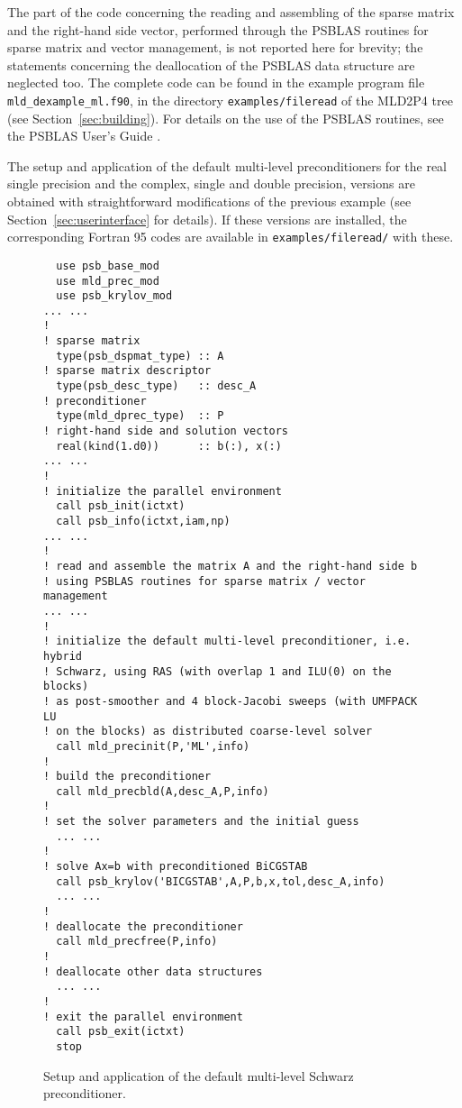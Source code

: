 The part of the code concerning the
reading and assembling of the sparse matrix and the right-hand side vector, performed
through the PSBLAS routines for sparse matrix and vector management, is not reported
here for brevity; the statements concerning the deallocation of the PSBLAS
data structure are neglected too.
The complete code can be found in the example program file \verb|mld_dexample_ml.f90|,
in the directory \verb|examples/fileread| of the MLD2P4 tree (see
Section~\ref{sec:building}).
For details on the use of the PSBLAS routines, see the PSBLAS User's
Guide \cite{PSBLASGUIDE}.

The setup and application of the default multi-level
preconditioners for the real single precision and the complex, single and double
precision, versions are obtained with straightforward modifications of the previous
example (see Section~\ref{sec:userinterface} for details). If these versions are installed,
the corresponding Fortran 95 codes are available in \verb|examples/fileread/| with these.

\begin{figure}[tbp]
\begin{center}
\begin{minipage}{.90\textwidth} 
{\small
\begin{verbatim}
  use psb_base_mod
  use mld_prec_mod
  use psb_krylov_mod
... ...
!
! sparse matrix
  type(psb_dspmat_type) :: A
! sparse matrix descriptor
  type(psb_desc_type)   :: desc_A
! preconditioner
  type(mld_dprec_type)  :: P
! right-hand side and solution vectors
  real(kind(1.d0))      :: b(:), x(:)
... ...
!
! initialize the parallel environment
  call psb_init(ictxt)
  call psb_info(ictxt,iam,np)
... ...
!
! read and assemble the matrix A and the right-hand side b 
! using PSBLAS routines for sparse matrix / vector management 
... ...
!
! initialize the default multi-level preconditioner, i.e. hybrid
! Schwarz, using RAS (with overlap 1 and ILU(0) on the blocks) 
! as post-smoother and 4 block-Jacobi sweeps (with UMFPACK LU
! on the blocks) as distributed coarse-level solver
  call mld_precinit(P,'ML',info)
!
! build the preconditioner
  call mld_precbld(A,desc_A,P,info)
!
! set the solver parameters and the initial guess
  ... ...
!
! solve Ax=b with preconditioned BiCGSTAB
  call psb_krylov('BICGSTAB',A,P,b,x,tol,desc_A,info)
  ... ...
!
! deallocate the preconditioner
  call mld_precfree(P,info)
!
! deallocate other data structures
  ... ...
!
! exit the parallel environment
  call psb_exit(ictxt)
  stop
\end{verbatim}
}
\end{minipage}
\caption{Setup and application of the default multi-level Schwarz preconditioner.
\label{fig:ex_default}}
\end{center}
\end{figure}

